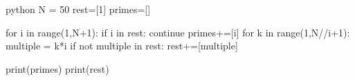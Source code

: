 \begin{mintedbox}{python}
N = 50
rest=[1]
primes=[]

for i in range(1,N+1):
    if i in rest:
        continue
    primes+=[i]
    for k in range(1,N//i+1):
        multiple = k*i
        if not multiple in rest:
            rest+=[multiple]
    
print(primes)
print(rest)
\end{mintedbox}


